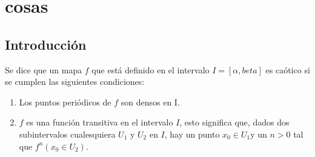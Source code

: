 \chapter{cosas}
\section{Introducción}

Se dice que un mapa $f$ que está definido en el intervalo $I= [\alpha, beta]$ es caótico si se cumplen las siguientes condiciones:

\begin{enumerate}
\item Los puntos periódicos de $f$ son densos en I.
\item $f$ es una función transitiva en el intervalo $I$, esto significa que, dados dos subintervalos cualesquiera $U_{1}$ y $U_{2}$ en $I$, hay un punto $x_{0} \in U_{1}$y un $n>0$ tal que $f^{n}(x_{0} \in U_{2})$.
\end{enumerate}